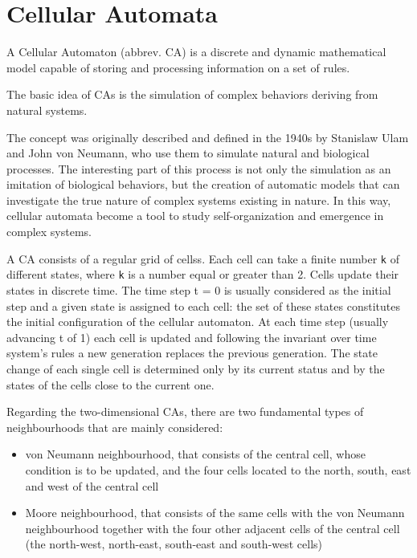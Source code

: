 \section{Cellular Automata}
\label{automi_cellulari}

A Cellular Automaton (abbrev. CA) is a discrete and dynamic mathematical model capable of storing and processing information on a set of rules.
\par
The basic idea of CAs is the simulation of complex behaviors deriving from natural systems.
\par
The concept was originally described and defined in the 1940s by Stanislaw Ulam and John von Neumann, who use them to simulate natural and biological processes. The interesting part of this process is not only the simulation as an imitation of biological behaviors, but the creation of automatic models that can investigate the true nature of complex systems existing in nature. In this way, cellular automata become a tool to study self-organization and emergence in complex systems.
\par
A CA consists of a regular grid of cellss. Each cell can take a finite number \texttt{k} of different states, where \texttt{k} is a number equal or greater than 2. Cells update their states in discrete time. The time step t = 0 is usually considered as the initial step and a given state is assigned to each cell: the set of these states constitutes the initial configuration of the cellular automaton.
At each time step (usually advancing t of 1) each cell is updated and following the invariant over time system's rules a new generation replaces the previous generation. The state change of each single cell is determined only by its current status and by the states of the cells close to the current one.
\par
Regarding the two-dimensional CAs, there are two fundamental types of neighbourhoods that are mainly considered:
\begin{itemize}
\item von Neumann neighbourhood, that consists of the central cell, whose condition is to be updated, and the four cells located to the north, south, east and west of the central cell
\item Moore neighbourhood, that consists of the same cells with the von Neumann neighbourhood together with the four other adjacent cells of the central cell (the north-west, north-east, south-east and south-west cells)
\end{itemize}
\par

